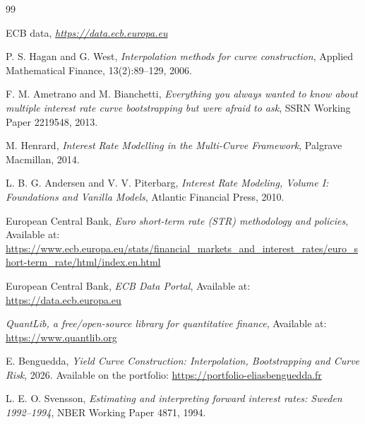 \documentclass[11pt,a4paper]{article}
\theoremstyle{plain}
\theoremstyle{definition}
\begin{document}
\begin{thebibliography}{99}

ECB data,
\textit{\url{https://data.ecb.europa.eu}}

P. S. Hagan and G. West,
\textit{Interpolation methods for curve construction},
Applied Mathematical Finance, 13(2):89--129, 2006.

F. M. Ametrano and M. Bianchetti,
\textit{Everything you always wanted to know about multiple interest rate curve bootstrapping but were afraid to ask},
SSRN Working Paper 2219548, 2013.

M. Henrard,
\textit{Interest Rate Modelling in the Multi-Curve Framework},
Palgrave Macmillan, 2014.

L. B. G. Andersen and V. V. Piterbarg,
\textit{Interest Rate Modeling, Volume I: Foundations and Vanilla Models},
Atlantic Financial Press, 2010.

European Central Bank,
\textit{Euro short-term rate (\texteuro STR) methodology and policies},
Available at: \url{https://www.ecb.europa.eu/stats/financial_markets_and_interest_rates/euro_short-term_rate/html/index.en.html}

European Central Bank,
\textit{ECB Data Portal},
Available at: \url{https://data.ecb.europa.eu}

\textit{QuantLib, a free/open-source library for quantitative finance},
Available at: \url{https://www.quantlib.org}

E. Benguedda,
\textit{Yield Curve Construction: Interpolation, Bootstrapping and Curve Risk},
2026. Available on the portfolio: \url{https://portfolio-eliasbenguedda.fr}

L. E. O. Svensson,
\textit{Estimating and interpreting forward interest rates: Sweden 1992--1994},
NBER Working Paper 4871, 1994.

\end{thebibliography}
\end{document}
